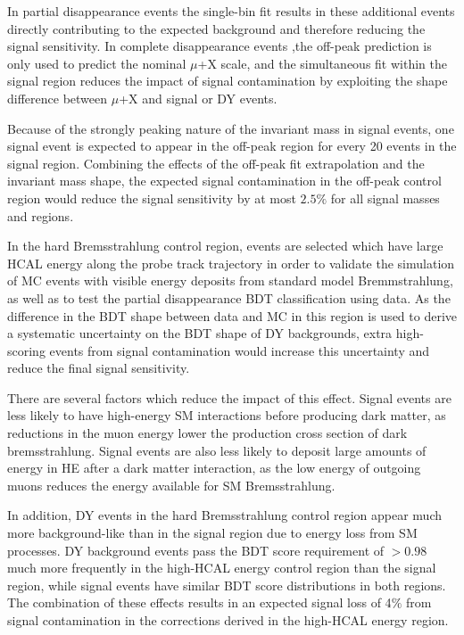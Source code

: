 In partial disappearance events the single-bin fit results in these additional events directly contributing to the expected background and therefore reducing the signal sensitivity. 
In complete disappearance events ,the off-peak prediction is only used to predict the nominal $\mu$+X scale, and the simultaneous fit within the signal region reduces the impact of signal contamination by exploiting the shape difference between $\mu$+X and signal or DY events.

Because of the strongly peaking nature of the invariant mass in signal events, one signal event is expected to appear in the off-peak region for every 20 events in the signal region.
Combining the effects of the off-peak fit extrapolation and the invariant mass shape, the expected signal contamination in the off-peak control region would reduce the signal sensitivity by at most $2.5\%$ for all signal masses and regions.

In the hard Bremsstrahlung control region, events are selected which have large HCAL energy along the probe track trajectory in order to validate the simulation of MC events with visible energy deposits from standard model Bremmstrahlung, as well as to test the partial disappearance BDT classification using data. 
As the difference in the BDT shape between data and MC in this region is used to derive a systematic uncertainty on the BDT shape of DY backgrounds, extra high-scoring events from signal contamination would increase this uncertainty and reduce the final signal sensitivity.

There are several factors which reduce the impact of this effect.
Signal events are less likely to have high-energy SM interactions before producing dark matter, as reductions in the muon energy lower the production cross section of dark bremsstrahlung.
Signal events are also less likely to deposit large amounts of energy in HE after a dark matter interaction, as the low energy of outgoing muons reduces the energy available for SM Bremsstrahlung. 

In addition, DY events in the hard Bremsstrahlung control region appear much more background-like than in the signal region due to energy loss from SM processes.
DY background events pass the BDT score requirement of $>0.98$ much more frequently in the high-HCAL energy control region than the signal region, while signal events have similar BDT score distributions in both regions. 
The combination of these effects results in an expected signal loss of 4$\%$ from signal contamination in the corrections derived in the high-HCAL energy region.

